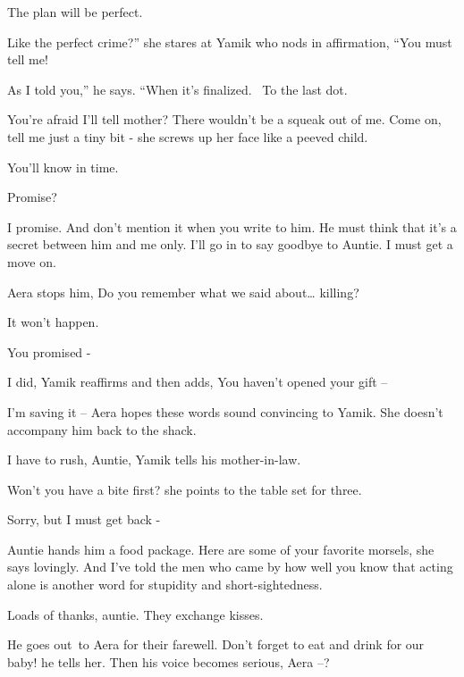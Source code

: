 \documentclass[letterpaper]{article}
\begin{document}
{\textquotedbl}The plan will be perfect.{\textquotedbl} 

{\textquotedbl}Like the perfect crime?'' she stares at Yamik who nods in affirmation, ``You must tell me!{\textquotedbl}


{\textquotedbl}As I told you,'' he says. ``When it's finalized.~ To the last dot.{\textquotedbl} 

{\textquotedbl}You're afraid I'll tell mother? There wouldn't be a squeak out of me. Come on, tell me just a tiny bit
-{\textquotedbl} she screws up her face like a peeved child. 

{\textquotedbl}You'll know in time.{\textquotedbl} 

{\textquotedbl}Promise?{\textquotedbl} 

{\textquotedbl}I promise. And don't mention it when you write to him. He must think that it's a secret between him and
me only. I'll go in to say goodbye to Auntie. I must get a move on.{\textquotedbl} 

Aera stops him, {\textquotedbl}Do you remember what we said about{\dots} killing?{\textquotedbl} 

{\textquotedbl}It won't happen.{\textquotedbl} 

{\textquotedbl}You promised -{\textquotedbl} 

{\textquotedbl}I did,{\textquotedbl} Yamik reaffirms and then adds, {\textquotedbl}You haven't opened your gift
--{\textquotedbl}

{\textquotedbl}I'm saving it --{\textquotedbl} Aera hopes these words sound convincing to Yamik. She doesn't accompany
him back to the shack.

{\textquotedbl}I have to rush, Auntie,{\textquotedbl} Yamik tells his mother-in-law. 

{\textquotedbl}Won't you have a bite first?{\textquotedbl} she points to the table set for three. 

{\textquotedbl}Sorry, but I must get back -{\textquotedbl} 

Auntie hands him a food package. {\textquotedbl}Here are some of your favorite morsels,{\textquotedbl} she says
lovingly. {\textquotedbl}And I've told the men who came by how well you know that acting alone is another word for
stupidity and short-sightedness.{\textquotedbl} 

{\textquotedbl}Loads of thanks, auntie.{\textquotedbl} They exchange kisses. 

He goes out\textcolor{red}{\ }to Aera for their farewell. {\textquotedbl}Don't forget to eat and drink for our
baby!{\textquotedbl} he tells her. Then his voice becomes serious, {\textquotedbl}Aera --?{\textquotedbl}
\end{document}

